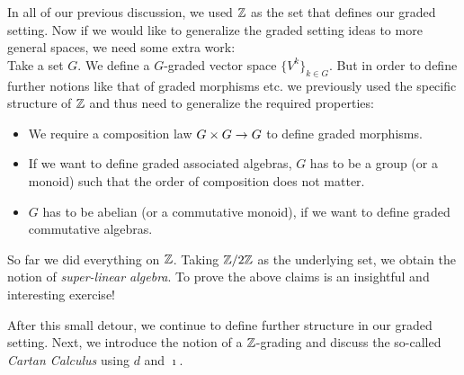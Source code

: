 \begin{rem}
  In all of our previous discussion, we used $\mathbb{Z}$ as the set that defines our graded setting. Now if we would like to generalize the graded setting ideas to more general spaces, we need some extra work:\\

  Take a set $G$. We define a $G$-graded vector space $\{V^k\}_{k \in G}$. But in order to define further notions like that of graded morphisms etc. we previously used the specific structure of $\mathbb{Z}$ and thus need to generalize the required properties:
  \begin{itemize}
    \item We require a composition law $G \times G \rightarrow G$ to define graded morphisms.
    \item If we want to define graded associated algebras, $G$ has to be a group (or a monoid) such that the order of composition does not matter.
    \item $G$ has to be abelian (or a commutative monoid), if we want to define graded commutative algebras.
  \end{itemize}
  So far we did everything on $\mathbb{Z}$. Taking $\mathbb{Z} / 2\mathbb{Z}$ as the underlying set, we obtain the notion of \emph{super-linear algebra}. To prove the above claims is an insightful and interesting exercise!
\end{rem}

After this small detour, we continue to define further structure in our graded setting. Next, we introduce the notion of a $\mathbb{Z}$-grading and discuss the so-called \emph{Cartan Calculus} using $d$ and $\imath$.

